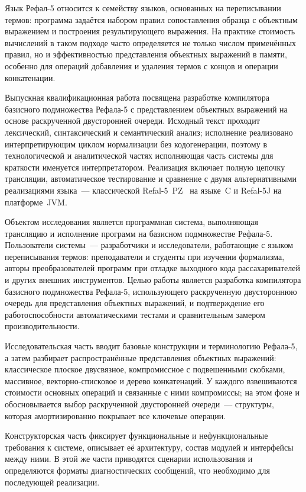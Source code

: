 Язык Рефал-5 относится к семейству языков, основанных на переписывании термов:
программа задаётся набором правил сопоставления образца с объектным выражением и
построения результирующего выражения. На практике стоимость вычислений в таком
подходе часто определяется не только числом применённых правил, но и эффективностью
представления объектных выражений в памяти, особенно для операций добавления и
удаления термов с концов и операции конкатенации.

Выпускная квалификационная работа посвящена разработке компилятора базисного
подмножества Рефала-5 с представлением объектных выражений на основе
раскрученной двусторонней очереди. Исходный текст проходит лексический,
синтаксический и семантический анализ; исполнение реализовано интерпретирующим
циклом нормализации без кодогенерации, поэтому в технологической и аналитической
частях исполняющая часть системы для краткости именуется интерпретатором.
Реализация включает полную цепочку
трансляции, автоматическое тестирование и сравнение с двумя альтернативными
реализациями языка~--- классической Refal-5~PZ~\cite{refal5_home} на
языке~C и Refal-5J на платформе~JVM.

Объектом исследования является программная система, выполняющая трансляцию и
исполнение программ на базисном подмножестве Рефала-5. Пользователи системы~---
разработчики и исследователи, работающие с языком переписывания термов: преподаватели
и студенты при изучении формализма, авторы преобразователей программ при отладке
выходного кода рассахаривателей и других внешних инструментов. Целью работы является
разработка компилятора базисного подмножества Рефала-5, использующего раскрученную
двустороннюю очередь для представления объектных выражений, и подтверждение его
работоспособности автоматическими тестами и сравнительным замером производительности.

Исследовательская часть вводит базовые конструкции и терминологию Рефала-5, а затем
разбирает распространённые представления объектных выражений: классическое плоское
двусвязное, компромиссное с подвешенными скобками, массивное, векторно-списковое и дерево
конкатенаций. У каждого взвешиваются стоимости основных операций и связанные с ними
компромиссы; на этом фоне и обосновывается выбор раскрученной двусторонней очереди~---
структуры, которая амортизированно покрывает все ключевые операции.

Конструкторская часть фиксирует функциональные и нефункциональные требования к
системе, описывает её архитектуру, состав модулей и интерфейсы между ними. В
этой же части приводятся сценарии использования и определяются форматы
диагностических сообщений, что необходимо для последующей реализации.

